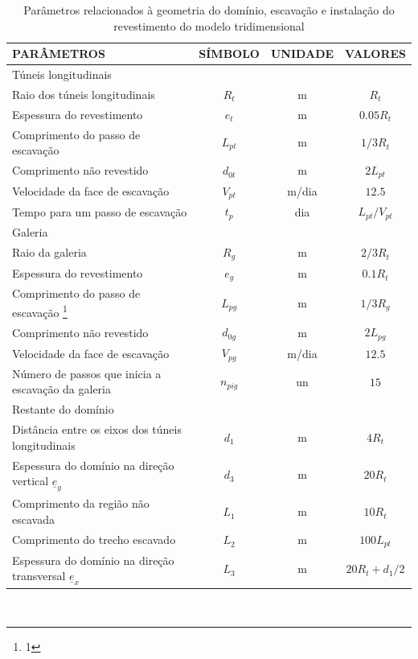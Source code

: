 \begin{table}[H]
	\caption{Parâmetros relacionados à geometria do domínio, escavação e instalação do revestimento do modelo tridimensional}
	\label{tabela3D}
	\centering
	\small
	\renewcommand{\arraystretch}{1.5}
	\begin{tabular}{l c c c}
		\hline
		\multicolumn{1}{l}{PARÂMETROS} &
		\multicolumn{1}{c}{SÍMBOLO} &
		\multicolumn{1}{c}{UNIDADE} &
		\multicolumn{1}{c}{VALORES} \\
		\hline
		\multicolumn{4}{l}{Túneis longitudinais} \\
		\hline
		Raio dos túneis longitudinais & $R_t$ & m & $R_t$ \\
		Espessura do revestimento & $e_t$ & m & $0.05R_t$ \\
		Comprimento do passo de escavação & $L_{pt}$ & m & $1/3R_t$ \\
		Comprimento não revestido & $d_{0t}$ & m & $2L_{pt}$ \\
		Velocidade da face de escavação & $V_{pt}$ & m/dia & $12.5$ \\
		Tempo para um passo de escavação & $t_p$ & dia & $L_{pt}/V_{pt}$ \\
		\hline
		\multicolumn{4}{l}{Galeria} \\
		\hline
		Raio da galeria & $R_{g}$ & m & $2/3R_t$ \\
		Espessura do revestimento & $e_g$ & m & $0.1R_t$ \\
		Comprimento do passo de escavação \footnote{1} & $L_{pg}$ & m & $1/3R_g$ \\
		Comprimento não revestido & $d_{0g}$ & m & $2L_{pg}$ \\
		Velocidade da face de escavação & $V_{pg}$ & m/dia & $12.5$ \\
			Número de passos que inicia a escavação da galeria & $n_{pig}$ & un & $15$ \\
		\hline
		\multicolumn{4}{l}{Restante do domínio} \\
		\hline
		Distância entre os eixos dos túneis longitudinais & $d_1$ & m & $4R_t $\\
		Espessura do domínio na direção vertical $\underline{e}_y$ & $d_3$ & m & $20R_t$ \\
		Comprimento da região não escavada & $L_1$ & m & $10R_t$ \\
		Comprimento do trecho escavado & $L_2$ & m & $100L_{pt}$ \\
		Espessura do domínio na direção transversal $\underline{e}_x$ & $L_3$ & m & $20R_t + d_1/2$ \\
		\hline
	\end{tabular}
	\normalsize
	\\ 
\end{table}


